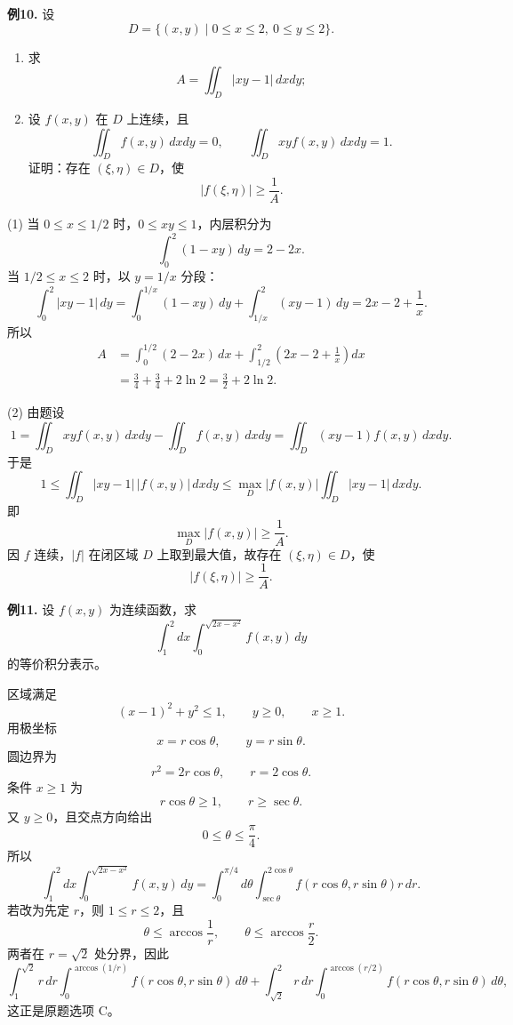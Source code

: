 \begin{problemblock}
\textbf{例10.} 设
\[
D=\{(x,y)\mid 0\le x\le2,\ 0\le y\le2\}.
\]
\begin{enumerate}[label=(\arabic*), leftmargin=2.2em]
\item 求
\[
A=\iint_D|xy-1|\,dxdy;
\]
\item 设 \(f(x,y)\) 在 \(D\) 上连续，且
\[
\iint_Df(x,y)\,dxdy=0,\qquad
\iint_Dxyf(x,y)\,dxdy=1.
\]
证明：存在 \((\xi,\eta)\in D\)，使
\[
|f(\xi,\eta)|\ge\frac1A.
\]
\end{enumerate}
\end{problemblock}
\begin{solutionblock}
(1) 当 \(0\le x\le1/2\) 时，\(0\le xy\le1\)，内层积分为
\[
\int_0^2(1-xy)\,dy=2-2x.
\]
当 \(1/2\le x\le2\) 时，以 \(y=1/x\) 分段：
\[
\int_0^2|xy-1|\,dy
=\int_0^{1/x}(1-xy)\,dy+\int_{1/x}^{2}(xy-1)\,dy
=2x-2+\frac1x.
\]
所以
\[
\begin{aligned}
A&=\int_0^{1/2}(2-2x)\,dx
+\int_{1/2}^{2}\left(2x-2+\frac1x\right)dx\\
&=\frac34+\frac34+2\ln2
=\frac32+2\ln2.
\end{aligned}
\]

(2) 由题设
\[
1=\iint_Dxyf(x,y)\,dxdy-\iint_Df(x,y)\,dxdy
=\iint_D(xy-1)f(x,y)\,dxdy.
\]
于是
\[
1\le \iint_D|xy-1|\,|f(x,y)|\,dxdy
\le \max_D|f(x,y)|\iint_D|xy-1|\,dxdy.
\]
即
\[
\max_D|f(x,y)|\ge\frac1A.
\]
因 \(f\) 连续，\(|f|\) 在闭区域 \(D\) 上取到最大值，故存在 \((\xi,\eta)\in D\)，使
\[
|f(\xi,\eta)|\ge\frac1A.
\]
\end{solutionblock}

\begin{problemblock}
\textbf{例11.} 设 \(f(x,y)\) 为连续函数，求
\[
\int_1^2dx\int_0^{\sqrt{2x-x^2}}f(x,y)\,dy
\]
的等价积分表示。
\end{problemblock}
\begin{solutionblock}
区域满足
\[
(x-1)^2+y^2\le1,\qquad y\ge0,\qquad x\ge1.
\]
用极坐标
\[
x=r\cos\theta,\qquad y=r\sin\theta.
\]
圆边界为
\[
r^2=2r\cos\theta,\qquad r=2\cos\theta.
\]
条件 \(x\ge1\) 为
\[
r\cos\theta\ge1,\qquad r\ge\sec\theta.
\]
又 \(y\ge0\)，且交点方向给出
\[
0\le\theta\le\frac\pi4.
\]
所以
\[
\int_1^2dx\int_0^{\sqrt{2x-x^2}}f(x,y)\,dy
=\int_0^{\pi/4}d\theta
\int_{\sec\theta}^{2\cos\theta}
f(r\cos\theta,r\sin\theta)r\,dr.
\]
若改为先定 \(r\)，则 \(1\le r\le2\)，且
\[
\theta\le \arccos\frac1r,\qquad
\theta\le \arccos\frac r2.
\]
两者在 \(r=\sqrt2\) 处分界，因此
\[
\int_1^{\sqrt2}r\,dr\int_0^{\arccos(1/r)}
f(r\cos\theta,r\sin\theta)\,d\theta
+\int_{\sqrt2}^{2}r\,dr\int_0^{\arccos(r/2)}
f(r\cos\theta,r\sin\theta)\,d\theta,
\]
这正是原题选项 C。
\end{solutionblock}

